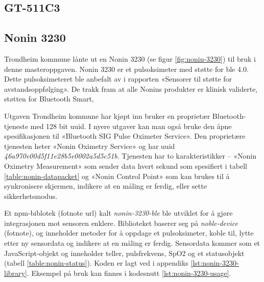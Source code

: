 \subsection{GT-511C3}

\subsection{Nonin 3230}
Trondheim kommune lånte ut en Nonin 3230 (se figur \ref{fig:nonin-3230}) til bruk i denne masteroppgaven.
Nonin 3230 er et pulsoksimeter med støtte for \gls{ble} 4.0. Dette pulsoksimeteret ble anbefalt av \citet{austad2016sensorer}
i rapporten «Sensorer til støtte for avstandsoppfølging». De trakk fram at alle Nonins produkter
er klinisk validerte, støtten for Bluetooth Smart,   

Utgaven Trondheim kommune har kjøpt inn bruker en proprietær Bluetooth-tjeneste med 128 bit \gls{uuid}.
I nyere utgaver kan man også bruke den åpne spesifikasjonen til «Bluetooth SIG Pulse Oximeter Service».
Den proprietære tjenesten heter «Nonin Oximetry Service» og har \gls{uuid} \textit{46a970e00d5f11e28b5e0002a5d5c51b}.
Tjenesten har to karakteristikker -- «Nonin Oximetry Measurement» som sender data hvert sekund som spesifiert
i tabell \ref{table:nonin-datapacket} og «Nonin Control Point» som kan brukes til å synkronisere skjermen,
indikere at en måling er ferdig, eller sette sikkerhetsmodus. 

Et \gls{npm}-biblotek (fotnote url) kalt \textit{nonin-3230-ble} ble utviklet for å gjøre integrasjonen mot sensoren enklere.
Biblioteket baserer seg på \textit{noble-device} (fotnote), og inneholder metoder for å oppdage et pulsoksimeter,
koble til, lytte etter ny sensordata og indikere at en måling er ferdig. Sensordata kommer som et JavaScript-objekt
og inneholder teller, pulsfrekvens, SpO2 og et statusobjekt (tabell \ref{table:nonin-status}).
Koden er lagt ved i appendiks \ref{lst:nonin-3230-library}.
Eksempel på bruk kan finnes i kodesnutt \ref{lst:nonin-3230-usage}.

